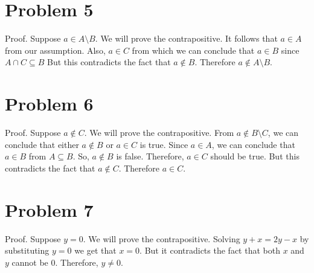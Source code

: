 \documentclass{article}
\begin{document}
\section{Problem 5}

Proof. Suppose $a \in A \setminus B$. We will prove the
contrapositive. It follows that $a \in A$ from our assumption. Also,
$a \in C$ from which we can conclude that $a \in B$ since $A \cap C
\subseteq B$ But this contradicts the fact that $a \notin B$.
Therefore $a \notin A \setminus B$.

\section{Problem 6}

Proof. Suppose $a \notin C$. We will prove the contrapositive. From $a
\notin B \setminus C$, we can conclude that either $a \notin B$ or $a
\in C$ is true. Since $a \in A$, we can conclude that $a \in B$ from
$A \subseteq B$. So, $a \notin B$ is false. Therefore, $a \in C$
should be true. But this contradicts the fact that $a \notin C$.
Therefore $a \in C$.

\section{Problem 7}

Proof. Suppose $y = 0$. We will prove the contrapositive. Solving $y +
x = 2y - x$ by substituting $y=0$ we get that $x=0$. But it
contradicts the fact that both $x$ and $y$ cannot be $0$. Therefore,
$y \neq 0$.
\end{document}

